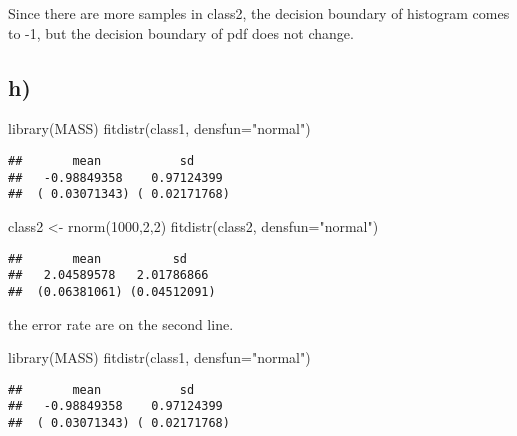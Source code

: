 \documentclass[
]{article}
\newenvironment{Shaded}{\begin{snugshade}}{\end{snugshade}}
\newcommand{\AttributeTok}[1]{\textcolor[rgb]{0.77,0.63,0.00}{#1}}
\newcommand{\DecValTok}[1]{\textcolor[rgb]{0.00,0.00,0.81}{#1}}
\newcommand{\FunctionTok}[1]{\textcolor[rgb]{0.00,0.00,0.00}{#1}}
\newcommand{\NormalTok}[1]{#1}
\newcommand{\OtherTok}[1]{\textcolor[rgb]{0.56,0.35,0.01}{#1}}
\newcommand{\StringTok}[1]{\textcolor[rgb]{0.31,0.60,0.02}{#1}}
\begin{document}
Since there are more samples in class2, the decision boundary of
histogram comes to -1, but the decision boundary of pdf does not change.

\hypertarget{h-1}{%
\subsection{h)}\label{h-1}}

\begin{Shaded}
\begin{Highlighting}[]
\FunctionTok{library}\NormalTok{(MASS)}
\FunctionTok{fitdistr}\NormalTok{(class1, }\AttributeTok{densfun=}\StringTok{"normal"}\NormalTok{)}
\end{Highlighting}
\end{Shaded}

\begin{verbatim}
##       mean           sd     
##   -0.98849358    0.97124399 
##  ( 0.03071343) ( 0.02171768)
\end{verbatim}

\begin{Shaded}
\begin{Highlighting}[]
\NormalTok{class2 }\OtherTok{\textless{}{-}} \FunctionTok{rnorm}\NormalTok{(}\DecValTok{1000}\NormalTok{,}\DecValTok{2}\NormalTok{,}\DecValTok{2}\NormalTok{)}
\FunctionTok{fitdistr}\NormalTok{(class2, }\AttributeTok{densfun=}\StringTok{"normal"}\NormalTok{)}
\end{Highlighting}
\end{Shaded}

\begin{verbatim}
##       mean          sd    
##   2.04589578   2.01786866 
##  (0.06381061) (0.04512091)
\end{verbatim}

the error rate are on the second line.

\begin{Shaded}
\begin{Highlighting}[]
\FunctionTok{library}\NormalTok{(MASS)}
\FunctionTok{fitdistr}\NormalTok{(class1, }\AttributeTok{densfun=}\StringTok{"normal"}\NormalTok{)}
\end{Highlighting}
\end{Shaded}

\begin{verbatim}
##       mean           sd     
##   -0.98849358    0.97124399 
##  ( 0.03071343) ( 0.02171768)
\end{verbatim}
\end{document}
